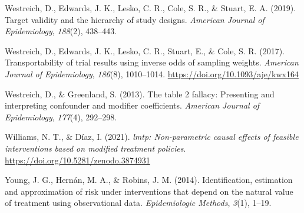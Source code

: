\documentclass[
  single column]{article}
\newlength{\cslhangindent}
\newenvironment{CSLReferences}[2] %
 {\begin{list}{}{%
  \setlength{\itemindent}{0pt}
  \setlength{\leftmargin}{0pt}
  \setlength{\parsep}{0pt}
  \ifodd #1
   \setlength{\leftmargin}{\cslhangindent}
   \setlength{\itemindent}{-1\cslhangindent}
  \fi
  \setlength{\itemsep}{#2\baselineskip}}}
 {\end{list}}
\begin{document}
\begin{CSLReferences}{1}{0}
Westreich, D., Edwards, J. K., Lesko, C. R., Cole, S. R., \& Stuart, E.
A. (2019). Target validity and the hierarchy of study designs.
\emph{American Journal of Epidemiology}, \emph{188}(2), 438--443.

Westreich, D., Edwards, J. K., Lesko, C. R., Stuart, E., \& Cole, S. R.
(2017). Transportability of trial results using inverse odds of sampling
weights. \emph{American Journal of Epidemiology}, \emph{186}(8),
1010--1014. \url{https://doi.org/10.1093/aje/kwx164}

Westreich, D., \& Greenland, S. (2013). The table 2 fallacy: Presenting
and interpreting confounder and modifier coefficients. \emph{American
Journal of Epidemiology}, \emph{177}(4), 292--298.

Williams, N. T., \& Díaz, I. (2021). \emph{{l}mtp: Non-parametric causal
effects of feasible interventions based on modified treatment policies}.
\url{https://doi.org/10.5281/zenodo.3874931}

Young, J. G., Hernán, M. A., \& Robins, J. M. (2014). Identification,
estimation and approximation of risk under interventions that depend on
the natural value of treatment using observational data.
\emph{Epidemiologic Methods}, \emph{3}(1), 1--19.

\end{CSLReferences}
\end{document}
